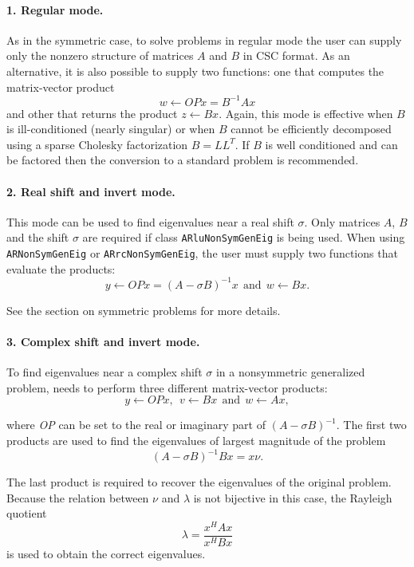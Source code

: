 \paragraph{1. Regular mode.}
As in the symmetric case, to solve problems in regular mode the user can supply only the nonzero structure of matrices $A$ and $B$ in CSC format. As an alternative, it is also possible to supply two functions: one that computes the matrix-vector product
\[w \leftarrow OPx=B^{-1} Ax\] 
and other that returns the product $z \leftarrow Bx$. Again, this mode is effective when $B$ is ill-conditioned (nearly singular) or when $B$ cannot be efficiently decomposed using a sparse Cholesky factorization $B=LL^{T}$. If $B$ is well conditioned and can be factored then the conversion to a standard problem is recommended.

\paragraph{2. Real shift and invert mode.}
This mode can be used to find eigenvalues near a real shift $\sigma$. Only matrices $A$, $B$ and the shift $\sigma$ are required if class \texttt{ARluNonSymGenEig} is being used. When using \texttt{ARNonSymGenEig} or \texttt{ARrcNonSymGenEig}, the user must supply two functions that evaluate the products:
\[y\leftarrow OPx=(A-\sigma B)^{-1} x \ \ \text{and} \ \ w\leftarrow Bx.\]

See the section on symmetric problems for more details.

\paragraph{3. Complex shift and invert mode.}
To find eigenvalues near a complex shift $\sigma$ in a nonsymmetric generalized problem, \ARPP{} needs to perform three different matrix-vector products: 
\[y\leftarrow OPx, \ \ v\leftarrow Bx \ \ \text{and} \ \ w\leftarrow Ax,\]

where \textit{OP} can be set to the real or imaginary part of $(A-\sigma B)^{-1}$. The first two products are used to find the eigenvalues of largest magnitude of the problem
\[(A-\sigma B)^{-1} Bx=x\nu.\]

The last product is required to recover the eigenvalues of the original problem. Because the relation between $\nu$ and $\lambda$ is not bijective in this case, the Rayleigh quotient 
\[\lambda = \dfrac{x^{H} Ax}{x^{H} Bx}\] 
is used to obtain the correct eigenvalues. 

